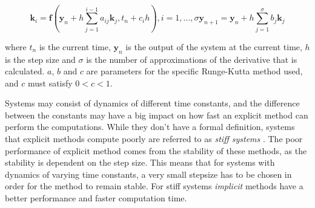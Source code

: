 \begin{subequations}
\begin{equation}
	\mathbf{k}_i = \mathbf{f}(\mathbf{y}_n + h \sum_{j=1}^{i-1} a_{ij}\mathbf{k}_j, t_n + c_ih), i = 1, ..., \sigma
\end{equation}
\begin{equation}
	\mathbf{y}_{n+1} = \mathbf{y}_n + h \sum_{j=1}^\sigma b_j \mathbf{k}_j
\end{equation}
\end{subequations}

where $t_n$ is the current time, $\mathbf{y}_n$ is the output of the system at the current time, $h$ is the step size and $\sigma$ is the number of approximations of the derivative that is calculated. $a$, $b$ and $c$ are parameters for the specific Runge-Kutta method used, and $c$ must satisfy $0 < c < 1$.

Systems may consist of dynamics of different time constants, and the difference between the constants may have a big impact on how fast an explicit method can perform the computations. While they don't have a formal definition, systems that explicit methods compute poorly are referred to as \textit{stiff systems} \cite{stiffBUI}. The poor performance of explicit method comes from the stability of these methods, as the stability is dependent on the step size. This means that for systems with dynamics of varying time constants, a very small stepsize has to be chosen in order for the method to remain stable. For stiff systems \textit{implicit} methods have a better performance and faster computation time. 




